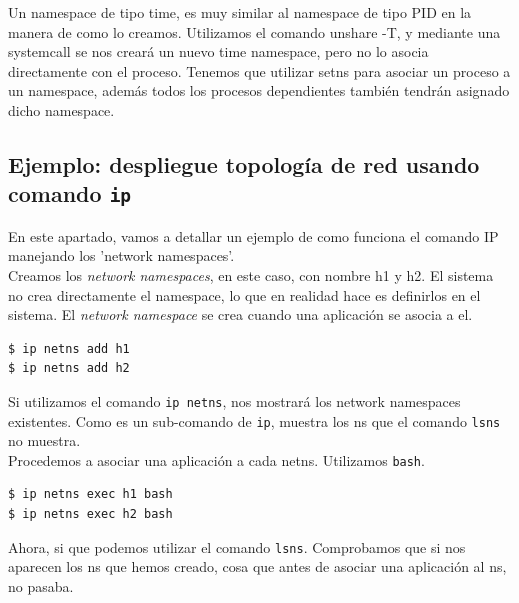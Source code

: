 \documentclass[12pt]{article}
\begin{document}
	\par \noindent Un namespace de tipo time, es muy similar al namespace de tipo PID en la manera de como lo creamos. Utilizamos el comando unshare -T, y mediante una systemcall se nos creará un nuevo time namespace, pero no lo asocia directamente con el proceso. Tenemos que utilizar setns para asociar un proceso a un namespace, además todos los procesos dependientes también tendrán asignado dicho namespace. 
	
	\addvspace{80px}
	
	
	\pagebreak
	
	\subsection{Ejemplo: despliegue topología de red usando comando \texttt{ip}}
	\noindent En este apartado, vamos a detallar un ejemplo de como funciona el comando IP manejando los 'network namespaces'.\\
	
	\noindent Creamos los \textit{network namespaces}, en este caso, con nombre h1 y h2. El sistema no crea directamente el namespace, lo que en realidad hace es definirlos en el sistema. El \textit{network namespace} se crea cuando una aplicación se asocia a el.
	\begin{verbatim}
$ ip netns add h1
$ ip netns add h2
	\end{verbatim}

	\noindent Si utilizamos el comando \texttt{ip netns}, nos mostrará los network namespaces existentes. Como es un sub-comando de \texttt{ip}, muestra los ns que el comando \texttt{lsns} no muestra. \\
	
	\noindent Procedemos a asociar una aplicación a cada netns. Utilizamos \texttt{bash}.
	\begin{verbatim}
$ ip netns exec h1 bash
$ ip netns exec h2 bash
	\end{verbatim}

	\noindent Ahora, si que podemos utilizar el comando \texttt{lsns}. Comprobamos que si nos aparecen los ns que hemos creado, cosa que antes de asociar una aplicación al ns, no pasaba. \\
	
\end{document}
